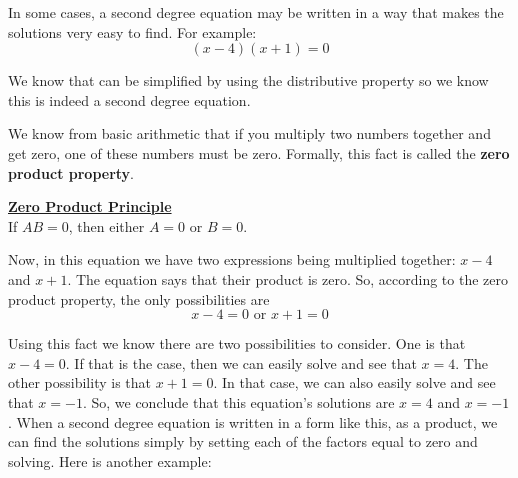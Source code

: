 In some cases, a second degree equation may be written in a way that makes the solutions very easy to find. For example:
$$(x-4)(x+1)=0$$

We know that can be simplified by using the distributive property so we know this is indeed a second degree equation.

We know from basic arithmetic that if you multiply two numbers together and get zero, one of these numbers must be zero.  Formally, this fact is called the \textbf{zero product property}.

%
%

\begin{definition}
	\textbf{\underline{Zero Product Principle}}\\
	\bigskip
	If $AB=0$, then either $A=0$ or $B=0$.
\end{definition}

Now, in this equation we have two expressions being multiplied together: $x-4$ and $x+1$.  The equation says that their product is zero.  So, according to the zero product property, the only possibilities are
$$x-4=0 \text{ or } x+1=0$$

Using this fact we know there are two possibilities to consider. One is that $x-4=0$. If that is the case, then we can easily solve and see that $x=4$. The other possibility is that $x+1=0$. In that case, we can also easily solve and see that $x=-1$. So, we conclude that this equation’s solutions are $x=4$ and $x=-1$.  When a second degree equation is written in a form like this, as a product, we can find the solutions simply by setting each of the factors equal to zero and solving. Here is another example:



